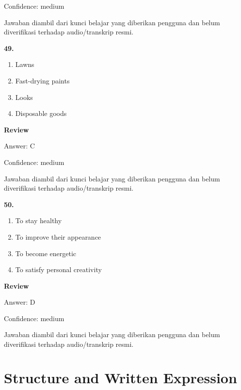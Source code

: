\documentclass[12pt]{article}
\begin{document}
Confidence: medium\par
Jawaban diambil dari kunci belajar yang diberikan pengguna dan belum diverifikasi terhadap audio/transkrip resmi.\par
\endgroup
\par
\vspace{0.25\baselineskip}
\noindent\textbf{49.}
\begin{enumerate}[label=(\Alph*),leftmargin=*,itemsep=0.2em]
\item Lawns
\item Fast-drying paints
\item Looks
\item Disposable goods
\end{enumerate}
\par
\begingroup
\setlength{\parskip}{0pt}
\setlength{\parindent}{0pt}
\textbf{Review}\par
Answer: C\par
Confidence: medium\par
Jawaban diambil dari kunci belajar yang diberikan pengguna dan belum diverifikasi terhadap audio/transkrip resmi.\par
\endgroup
\par
\vspace{0.25\baselineskip}
\noindent\textbf{50.}
\begin{enumerate}[label=(\Alph*),leftmargin=*,itemsep=0.2em]
\item To stay healthy
\item To improve their appearance
\item To become energetic
\item To satisfy personal creativity
\end{enumerate}
\par
\begingroup
\setlength{\parskip}{0pt}
\setlength{\parindent}{0pt}
\textbf{Review}\par
Answer: D\par
Confidence: medium\par
Jawaban diambil dari kunci belajar yang diberikan pengguna dan belum diverifikasi terhadap audio/transkrip resmi.\par
\endgroup
\par
\vspace{0.25\baselineskip}
\section*{Structure and Written Expression}
\end{document}
